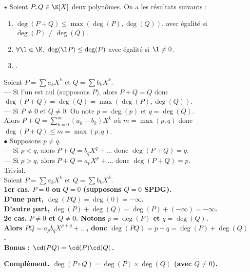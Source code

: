 \documentclass[11pt]{article}
\begin{document}
\begin{prop}{$\star$}{}
    Soient $P,Q\in\K[X]$ deux polynômes. On a les résultats suivants :
    \begin{enumerate}
        \item $\deg(P+Q)\leq\max(\deg(P),\deg(Q))$, avec égalité si $\deg(P)\neq\deg(Q)$.
        \item $\forall \l \in \K, ~ \deg(\l P) \leq \deg(P)$ avec égalité si $\l\neq0$.
        \item {}.
    \end{enumerate}
    \tcblower
     Soient $P=\sum a_kX^k$ et $Q=\sum b_kX^k$.\\
    --- Si l'un est nul (supposons $P$), alors $P+Q=Q$ donc $\deg(P+Q)=\deg(Q)=\max(\deg(P),\deg(Q))$.\\
    --- Si $P\neq0$ et $Q\neq0$. On note $p=\deg(p)$ et $q=\deg(Q)$.\\
    Alors $P+Q=\sum_{k=0}^m (a_k+b_k)X^k$ où $m=\max(p,q)$ donc $\deg(P+Q)\leq m = \max(p,q)$.\\
    $\bullet$ Supposons $p\neq q$.\\
    --- Si $p<q$, alors $P+Q=b_qX^q + ...$ donc $\deg(P+Q)=q$.\\
    --- Si $p>q$, alors $P+Q=a_pX^p+...$ donc $\deg(P+Q)=p$.\\
     Trivial.\\
    \boxed{\star} Soient $P=\sum a_kX^k$ et $Q=\sum b_kX^k$.\\
    \bf{1er cas.} $P=0$ ou $Q=0$ (supposons $Q=0$ SPDG).\\
    D'une part, $\deg(PQ)=\deg(0)=-\infty$.\\
    D'autre part, $\deg(P)+\deg(Q)=\deg(P) + (-\infty) = -\infty$.\\
    \bf{2e cas.} $P\neq0$ et $Q\neq0$. Notons $p=\deg(P)$ et $q=\deg(Q)$.\\
    Alors $PQ=a_pb_qX^{p+q} + ...$, donc $\deg(PQ)=p+q=\deg(P)+\deg(Q)$.\\
    Bonus : $\cd(PQ)=\cd(P)\cd(Q)$.
\end{prop}

\bf{Complément.} $\deg(P\circ Q)=\deg(P)\times\deg(Q)$ (avec $Q\neq0$).

\vspace{0.7cm}
\end{document}
